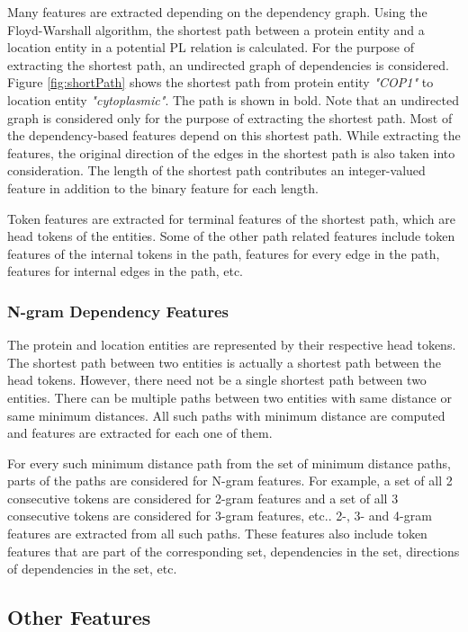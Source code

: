 Many features are extracted depending on the dependency graph. Using the Floyd-Warshall algorithm, the shortest path between a protein entity and a location entity in a potential PL relation is calculated. For the purpose of extracting the shortest path, an undirected graph of dependencies is considered. Figure \ref{fig:shortPath} shows the shortest path from protein entity \textit{"COP1"} to location entity \textit{"cytoplasmic"}. The path is shown in bold. Note that an undirected graph is considered only for the purpose of extracting the shortest path. Most of the dependency-based features depend on this shortest path. While extracting the features, the original direction of the edges in the shortest path is also taken into consideration. The length of the shortest path contributes an integer-valued feature in addition to the binary feature for each length.

Token features are extracted for terminal features of the shortest path, which are head tokens of the entities. Some of the other path related features include token features of the internal tokens in the path, features for every edge in the path, features for internal edges in the path, etc.

\subsubsection*{N-gram Dependency Features}

The protein and location entities are represented by their respective head tokens. The shortest path between two entities is actually a shortest path between the head tokens. However, there need not be a single shortest path between two entities. There can be multiple paths between two entities with same distance or same minimum distances. All such paths with minimum distance are computed and features are extracted for each one of them.

For every such minimum distance path from the set of minimum distance paths, parts of the paths are considered for N-gram features. For example, a set of all 2 consecutive tokens are considered for 2-gram features and a set of all 3 consecutive tokens are considered for 3-gram features, etc.. 2-, 3- and 4-gram features are extracted from all such paths. These features also include token features that are part of the corresponding set, dependencies in the set, directions of dependencies in the set, etc.

\subsection*{Other Features}

